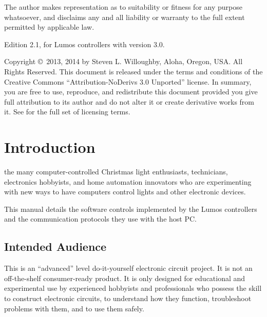 \documentclass[letterpaper,twoside,onecolumn,openright,final]{memoir}
\begin{document}
The author makes  representation as to suitability or fitness for any purpose whatsoever, and disclaims any and all liability or warranty to the full extent permitted by applicable law.

\strut\vfill
\noindent Edition 2.1, for Lumos controllers with  version 3.0.

\smallskip


\noindent Copyright \copyright\ 2013, 2014 by Steven L. Willoughby,
Aloha, Oregon, USA.  All Rights Reserved.  
This document is released under the terms and conditions of the 
Creative Commons ``Attribution-NoDerivs 3.0 Unported'' license.  
In summary, you are free to use, reproduce, and redistribute this 
document provided you give full attribution to its author and do not
alter it or create derivative works from it.  See
 for the full
set of licensing terms.

\begin{center}
\end{center}

\newpage
\tableofcontents

\mainmatter

\chapter{Introduction}
 the many computer-controlled
Christmas light enthusiasts,  technicians, electronics hobbyists,
and home automation innovators who are experimenting with new ways to have computers
control lights and other electronic devices.

This manual details the software controls implemented by the Lumos controllers
and the communication protocols they use with the host PC.

\section{Intended Audience}
This is an ``advanced'' level do-it-yourself electronic circuit project.  It is not
an off-the-shelf consumer-ready product.  It is only designed for educational and experimental
use by experienced hobbyists and professionals who possess the skill to construct electronic
circuits, to understand how they function, troubleshoot problems with them, and to use them safely.
\end{document}
